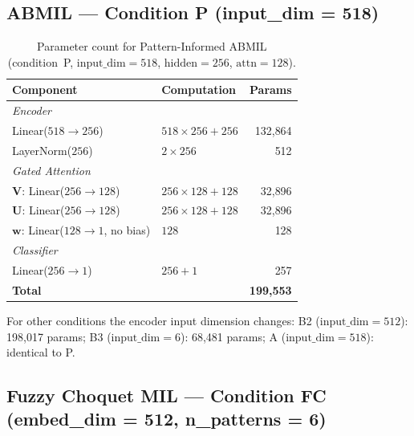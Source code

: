 \subsection{ABMIL --- Condition P (input\_dim = 518)}

\begin{table}[htbp]
\centering
\small
\caption{Parameter count for Pattern-Informed ABMIL (condition~P,
$\text{input\_dim} = 518$, $\text{hidden} = 256$, $\text{attn} = 128$).}
\label{tab:params_abmil_detail}
\begin{tabular}{l l r}
\hline
\textbf{Component} & \textbf{Computation} & \textbf{Params} \\
\hline
\multicolumn{3}{l}{\textit{Encoder}} \\
Linear($518 \to 256$)       & $518 \times 256 + 256$    & 132{,}864 \\
LayerNorm($256$)            & $2 \times 256$            & 512 \\
\hline
\multicolumn{3}{l}{\textit{Gated Attention}} \\
$\mathbf{V}$: Linear($256 \to 128$) & $256 \times 128 + 128$  & 32{,}896 \\
$\mathbf{U}$: Linear($256 \to 128$) & $256 \times 128 + 128$  & 32{,}896 \\
$\mathbf{w}$: Linear($128 \to 1$, no bias) & $128$             & 128 \\
\hline
\multicolumn{3}{l}{\textit{Classifier}} \\
Linear($256 \to 1$)         & $256 + 1$                 & 257 \\
\hline
\textbf{Total}              &                           & \textbf{199{,}553} \\
\hline
\end{tabular}
\end{table}

For other conditions the encoder input dimension changes:
B2 ($\text{input\_dim} = 512$): 198{,}017 params;
B3 ($\text{input\_dim} = 6$): 68{,}481 params;
A ($\text{input\_dim} = 518$): identical to P.

\subsection{Fuzzy Choquet MIL --- Condition FC (embed\_dim = 512, n\_patterns = 6)}

